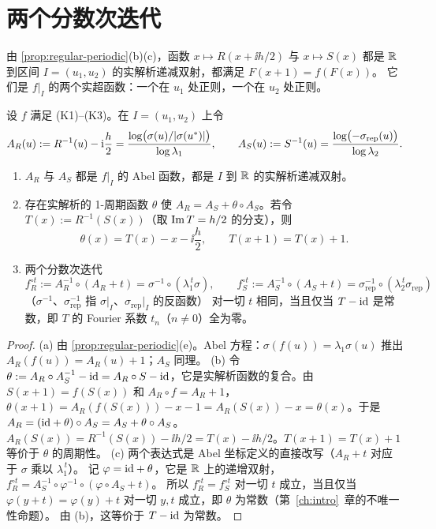 \section{两个分数次迭代}\label{ch2:sec:two}

由 \cref{prop:regular-periodic}(b)(c)，函数 $x\mapsto R(x+\ii h/2)$ 与 $x\mapsto S(x)$ 都是 $\mathbb{R}$ 到区间 $I=(u_1,u_2)$ 的实解析递减双射，都满足 $F(x+1)=f(F(x))$。
它们是 $f|_I$ 的两个实超函数：一个在 $u_1$ 处正则，一个在 $u_2$ 处正则。

\begin{proposition}\label{ch2:prop:two-abel}
设 $f$ 满足 \textup{(K1)--(K3)}。在 $I=(u_1,u_2)$ 上令
\[
  A_R(u):=R^{-1}(u)-\mathrm{i}\frac h2=\frac{\log\bigl(\sigma(u)/|\sigma(u^{*})|\bigr)}{\log\lambda_1},\qquad
  A_S(u):=S^{-1}(u)=\frac{\log\bigl(-\sigma_{\mathrm{rep}}(u)\bigr)}{\log\lambda_2}.
\]
\begin{enumerate}[label=(\alph*)]
\item $A_R$ 与 $A_S$ 都是 $f|_I$ 的 Abel 函数，都是 $I$ 到 $\mathbb{R}$ 的实解析递减双射。
\item 存在实解析的 1-周期函数 $\theta$ 使 $A_R=A_S+\theta\circ A_S$。若令 $T(x):=R^{-1}(S(x))$（取 $\operatorname{Im} T=h/2$ 的分支），则
  \[
    \theta(x)=T(x)-x-\ii\frac h2,\qquad T(x+1)=T(x)+1 .
  \]
\item 两个分数次迭代
  \[
    f_R^{\circ t}:=A_R^{-1}\circ(A_R+t)=\sigma^{-1}\circ(\lambda_1^{\,t}\sigma),\qquad
    f_S^{\circ t}:=A_S^{-1}\circ(A_S+t)=\sigma_{\mathrm{rep}}^{-1}\circ(\lambda_2^{\,t}\sigma_{\mathrm{rep}})
  \]
  （$\sigma^{-1}$、$\sigma_{\mathrm{rep}}^{-1}$ 指 $\sigma|_I$、$\sigma_{\mathrm{rep}}|_I$ 的反函数）
  对一切 $t$ 相同，当且仅当 $T-\mathrm{id}$ 是常数，即 $T$ 的 Fourier 系数 $t_n$（$n\ne0$）全为零。
\end{enumerate}
\end{proposition}

\begin{proof}
(a) 由 \cref{prop:regular-periodic}(e)。Abel 方程：$\sigma(f(u))=\lambda_1\sigma(u)$ 推出 $A_R(f(u))=A_R(u)+1$；$A_S$ 同理。
(b) 令 $\theta:=A_R\circ A_S^{-1}-\mathrm{id}=A_R\circ S-\mathrm{id}$，它是实解析函数的复合。由 $S(x+1)=f(S(x))$ 和 $A_R\circ f=A_R+1$，
$\theta(x+1)=A_R(f(S(x)))-x-1=A_R(S(x))-x=\theta(x)$。于是 $A_R=(\mathrm{id}+\theta)\circ A_S=A_S+\theta\circ A_S$。
$A_R(S(x))=R^{-1}(S(x))-\ii h/2=T(x)-\ii h/2$。$T(x+1)=T(x)+1$ 等价于 $\theta$ 的周期性。
(c) 两个表达式是 Abel 坐标定义的直接改写（$A_R+t$ 对应于 $\sigma$ 乘以 $\lambda_1^{\,t}$）。
记 $\varphi=\mathrm{id}+\theta$，它是 $\mathbb{R}$ 上的递增双射，$f_R^{\circ t}=A_S^{-1}\circ\varphi^{-1}\circ(\varphi\circ A_S+t)$。
所以 $f_R^{\circ t}=f_S^{\circ t}$ 对一切 $t$ 成立，当且仅当 $\varphi(y+t)=\varphi(y)+t$ 对一切 $y,t$ 成立，即 $\theta$ 为常数（第~\ref{ch:intro}~章的不唯一性命题）。
由 (b)，这等价于 $T-\mathrm{id}$ 为常数。
\end{proof}

